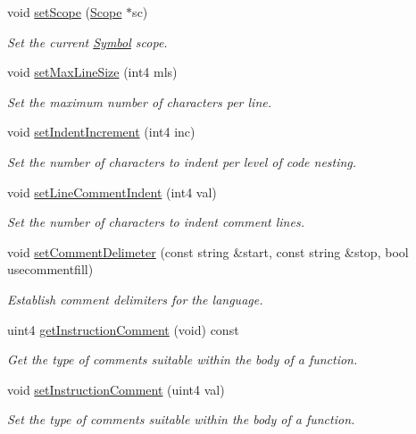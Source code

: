 \begin{DoxyCompactItemize}
void \mbox{\hyperlink{class_print_language_a5feab7153a5365d18a0deb5e0e132cba}{set\+Scope}} (\mbox{\hyperlink{class_scope}{Scope}} $\ast$sc)
\begin{DoxyCompactList}\small\item\em Set the current \mbox{\hyperlink{class_symbol}{Symbol}} scope. \end{DoxyCompactList}\item 
void \mbox{\hyperlink{class_print_language_a15e8b97bbcbc19b0235339cafeb39d79}{set\+Max\+Line\+Size}} (int4 mls)
\begin{DoxyCompactList}\small\item\em Set the maximum number of characters per line. \end{DoxyCompactList}\item 
void \mbox{\hyperlink{class_print_language_aeb4cf2e83c51955a1f03b38c322838cc}{set\+Indent\+Increment}} (int4 inc)
\begin{DoxyCompactList}\small\item\em Set the number of characters to indent per level of code nesting. \end{DoxyCompactList}\item 
void \mbox{\hyperlink{class_print_language_a3fff2b3ce27f87722011688cd3ba19d6}{set\+Line\+Comment\+Indent}} (int4 val)
\begin{DoxyCompactList}\small\item\em Set the number of characters to indent comment lines. \end{DoxyCompactList}\item 
void \mbox{\hyperlink{class_print_language_aeb989b6e336308e202e82035595443fb}{set\+Comment\+Delimeter}} (const string \&start, const string \&stop, bool usecommentfill)
\begin{DoxyCompactList}\small\item\em Establish comment delimiters for the language. \end{DoxyCompactList}\item 
uint4 \mbox{\hyperlink{class_print_language_a221d681401ac7dbeda9d1abb82b04863}{get\+Instruction\+Comment}} (void) const
\begin{DoxyCompactList}\small\item\em Get the type of comments suitable within the body of a function. \end{DoxyCompactList}\item 
void \mbox{\hyperlink{class_print_language_a74c68960b53e9db5de7a3cc3651fe652}{set\+Instruction\+Comment}} (uint4 val)
\begin{DoxyCompactList}\small\item\em Set the type of comments suitable within the body of a function. \end{DoxyCompactList}\item 

\end{DoxyCompactItemize}
